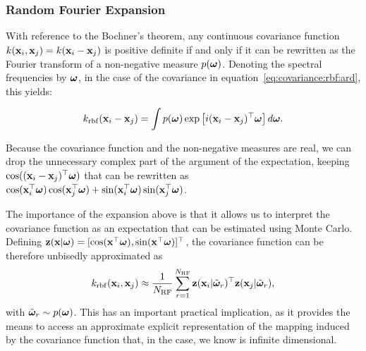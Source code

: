\subsubsection{Random Fourier Expansion}

With reference to the Bochner's theorem, any continuous covariance function $k(\mathbf{x}_i, \mathbf{x}_j) = k(\mathbf{x}_i - \mathbf{x}_j)$ is positive definite if and only if it can be rewritten as the Fourier transform of a non-negative measure $p(\boldsymbol{\omega})$. Denoting the spectral frequencies by $\boldsymbol{\omega}$, in the case of the \rbf covariance in equation~\ref{eq:covariance:rbf:ard}, this yields:

\begin{equation}
k_{\mathrm{rbf}}(\mathbf{x}_i - \mathbf{x}_j) = \int p(\boldsymbol{\omega}) \exp\left[i (\mathbf{x}_i - \mathbf{x}_j)^{\top} \boldsymbol{\omega} \right] d\boldsymbol{\omega} \text{.}
\end{equation}

Because the covariance function and the non-negative measures are real, we can drop the unnecessary complex part of the argument of the expectation, keeping $\cos((\mathbf{x}_i - \mathbf{x}_j)^{\top} \boldsymbol{\omega})$ that can be rewritten as
$\cos(\mathbf{x}_i^{\top} \boldsymbol{\omega}) \cos(\mathbf{x}_j^{\top} \boldsymbol{\omega}) + \sin(\mathbf{x}_i^{\top} \boldsymbol{\omega}) \sin(\mathbf{x}_j^{\top} \boldsymbol{\omega})$.

The importance of the expansion above is that it allows us to interpret the covariance function as an expectation that can be estimated using Monte Carlo.
Defining $\mathbf{z}(\mathbf{x} | \boldsymbol{\omega}) = [\cos(\mathbf{x}^{\top} \boldsymbol{\omega}), \sin(\mathbf{x}^{\top} \boldsymbol{\omega})]^{\top}$,
the covariance function can be therefore unbisedly approximated as %
\begin{equation}
k_{\mathrm{rbf}}(\mathbf{x}_i, \mathbf{x}_j) \approx \frac{1}{N_{\mathrm{RF}}} \sum_{r=1}^{N_{\mathrm{RF}}} \mathbf{z}(\mathbf{x}_i | \tilde{\boldsymbol{\omega}}_r)^{\top} \mathbf{z}(\mathbf{x}_j | \tilde{\boldsymbol{\omega}}_r) \text{,}
\end{equation}
with $\tilde{\boldsymbol{\omega}}_{r} \sim p(\boldsymbol{\omega})$.
This has an important practical implication, as it provides the means to access an approximate explicit representation of the mapping induced by the covariance function that, in the \rbf case, we know is infinite dimensional.

